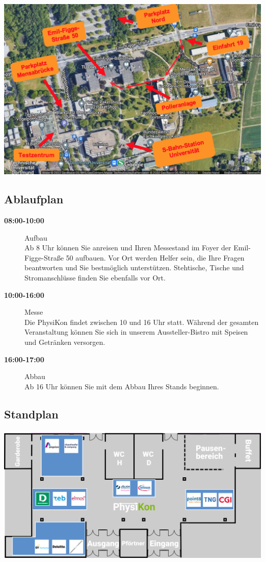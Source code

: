 \documentclass[
  paper=a4,
  fontsize=12pt,
  DIV=16,
  headheight=30pt,
  footheight=45pt,
  headinclude,
  parskip=half,
]{scrartcl}
\begin{document}
\includegraphics[width=\textwidth]{images/anfahrtskizze.jpg}


\subsection*{Ablaufplan}
\begin{description}
    \item[\textbf{08:00-10:00}] Aufbau\\
      Ab 8 Uhr können Sie anreisen und Ihren Messestand im Foyer der Emil-Figge-Straße 50 aufbauen.
      Vor Ort werden Helfer sein, die Ihre Fragen beantworten und Sie bestmöglich unterstützen.
      Stehtische, Tische und Stromanschlüsse finden Sie ebenfalls vor Ort.
    \item[\textbf{10:00-16:00}] Messe\\
      Die PhysiKon findet zwischen 10 und 16 Uhr statt.
      Während der gesamten Veranstaltung können Sie sich in unserem Aussteller-Bistro mit Speisen und Getränken versorgen.
    \item[\textbf{16:00-17:00}] Abbau\\
      Ab 16 Uhr können Sie mit dem Abbau Ihres Stands beginnen.
  \end{description}

\subsection*{Standplan}

\includegraphics[width=\textwidth]{images/messeplan.png}
\end{document}
